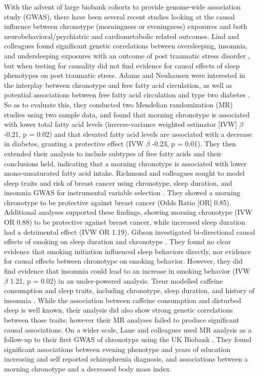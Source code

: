 \documentclass[journal,article,submit,moreauthors,pdftex]{Definitions/mdpi}
\begin{document}
With the advent of large biobank cohorts to provide genome-wide association study (GWAS), there have been several recent studies looking at the causal influence between chronotype (morningness or eveningness) exposures and both neurobehavioral/psychiatric and cardiometabolic related outcomes. Lind and colleagues found significant genetic correlations between oversleeping, insomnia, and undersleeping exposures with an outcome of post traumatic stress disorder \cite{lind_molecular_2020}, but when testing for causality did not find evidence for causal effects of sleep phenotypes on post traumatic stress. Adams and Neuhausen were interested in the interplay between chronotype and free fatty acid circulation, as well as potential associations  between free fatty acid circulation and type two diabetes \cite{adams_evaluating_2019}. So as to evaluate this, they conducted two Mendelian randomization (MR) studies using two sample data, and found that morning chronotype is associated with lower total fatty acid levels (inverse‐variance weighted estimator [IVW] $\beta$ -0.21, p = 0.02) and that elevated fatty acid levels are associated with a decrease in diabetes, granting a protective effect (IVW $\beta$ -0.23, p = 0.01). They then extended their analysis to include subtypes of free fatty acids and their conclusions held, indicating that a morning chronotype is associated with lower mono-unsaturated fatty acid intake. Richmond and colleagues sought to model sleep traits and risk of breast cancer using chronotype, sleep duration, and insomnia GWAS for instrumental variable selection \cite{richmond_investigating_2019}. They showed a morning chronotype to be protective against breast cancer (Odds Ratio [OR] 0.85). Additional analyses supported these findings, showing morning chronotype (IVW OR 0.88) to be protective against breast cancer, while increased sleep duration had a detrimental effect (IVW OR 1.19). Gibson investigated bi-directional causal effects of smoking on sleep duration and chronotype \cite{gibson_evidence_2019}. They found no clear evidence that smoking initiation influenced sleep behaviors directly, nor evidence for causal effects between chronotype on smoking behavior. However, they did find evidence that insomnia could lead to an increase in smoking behavior (IVW $\beta$ 1.21, p = 0.02) in an under-powered analysis. Treur modelled caffeine consumption and sleep traits, including chronotype, sleep duration, and history of insomnia \cite{treur_investigating_2018}. While the association between caffeine consumption and disturbed sleep is well known, their analysis did also show strong genetic correlations between those traits; however their MR analyses failed to produce significant causal associations. On a wider scale, Lane and colleagues used MR analysis as a follow-up to their first GWAS of chronotype using the UK Biobank \cite{lane_genome-wide_2016}. They found significant associations between evening phenotype and years of education increasing and self reported schizophrenia diagnosis, and associations between a morning chronotype and a decreased body mass index. 
\end{document}
